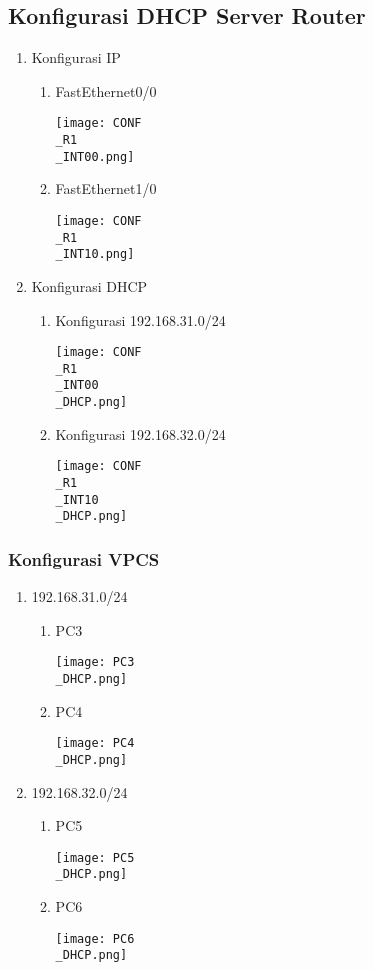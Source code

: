 \documentclass[12pt, a4paper]{article}
\begin{document}
\subsection*{Konfigurasi DHCP Server Router}
\begin{enumerate}
  \item Konfigurasi IP

    \begin{enumerate}

      \item FastEthernet0/0

        \texttt{[image: CONF\\\_R1\\\_INT00.png]}

      \item FastEthernet1/0

        \texttt{[image: CONF\\\_R1\\\_INT10.png]}

    \end{enumerate}


  \item Konfigurasi DHCP
    \begin{enumerate}
      \item Konfigurasi 192.168.31.0/24

        \texttt{[image: CONF\\\_R1\\\_INT00\\\_DHCP.png]}

      \item Konfigurasi 192.168.32.0/24

        \texttt{[image: CONF\\\_R1\\\_INT10\\\_DHCP.png]}

    \end{enumerate}
\end{enumerate}
\subsubsection*{Konfigurasi VPCS}
\begin{enumerate}
  \item 192.168.31.0/24
    \begin{enumerate}
      \item PC3

        \texttt{[image: PC3\\\_DHCP.png]}

      \item PC4
        
        \texttt{[image: PC4\\\_DHCP.png]}

    \end{enumerate}
  \item 192.168.32.0/24
    \begin{enumerate}
      \item PC5

        \texttt{[image: PC5\\\_DHCP.png]}

      \item PC6

        \texttt{[image: PC6\\\_DHCP.png]}

    \end{enumerate}
\end{enumerate}
\end{document}
